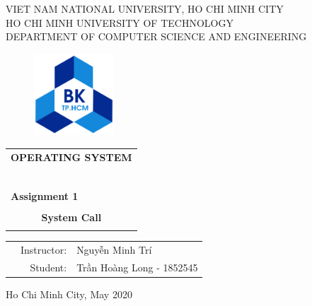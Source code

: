 \documentclass[a4paper]{article}
\begin{document}
\begin{titlepage}
   
\begin{center}
VIET NAM NATIONAL UNIVERSITY, HO CHI MINH CITY \\
HO CHI MINH UNIVERSITY OF TECHNOLOGY\\
DEPARTMENT OF COMPUTER SCIENCE AND ENGINEERING 
\end{center}

\vspace{1cm}

\begin{figure}[h!]
\begin{center}
\includegraphics[width=3cm]{hcmut.png}
\end{center}
\end{figure}

\vspace{1cm}


\begin{center}
\begin{tabular}{c}
\multicolumn{1}{l}{\textbf{{\Large OPERATING SYSTEM}}}\\
~~\\
\hline
\\
\multicolumn{1}{l}{\textbf{{\Large Assignment 1}}}\\
\\
\textbf{{\Huge System Call}}\\
\\
\hline
\end{tabular}
\end{center}

\vspace{3cm}

\begin{table}[h]
\begin{tabular}{rrl}
\hspace{5 cm} & Instructor: & Nguyễn Minh Trí\\
& Student: & Trần Hoàng Long - 1852545 \\
\end{tabular}
\end{table}

\begin{center}
{\footnotesize Ho Chi Minh City, May 2020}
\end{center}
\end{titlepage}
\end{document}
